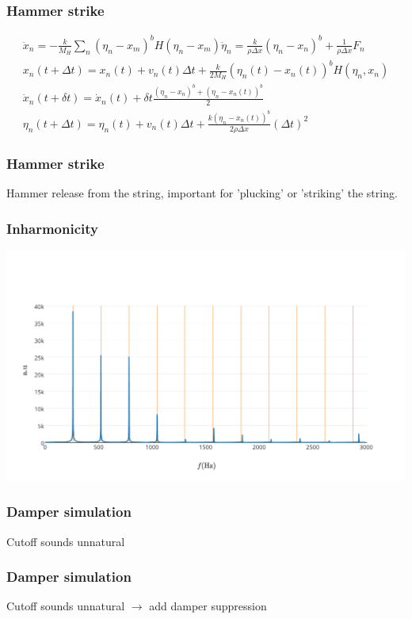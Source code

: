 \documentclass{beamer}
\begin{document}
\begin{frame}\frametitle{Hammer strike}
\begin{gather*}
\ddot{x}_n = -\frac{k}{M_H}\sum_n (\eta_n-x_m)^bH(\eta_n-x_m)\ddot{\eta}_n = \frac{k}{\rho\Delta x}\left(\eta_n-x_n\right)^b+\frac{1}{\rho\Delta x}F_n\\
x_n(t+\Delta t) = x_n(t) + v_n(t)\Delta t + \frac{k}{2M_H}\left(\eta_n(t)-x_n(t)\right)^bH(\eta_n,x_n)\\
\dot{x}_n(t+\delta t) = \dot{x}_n(t) + \delta t \frac{\left(\eta_n-x_n\right)^b+\left(\eta_n-x_n(t)\right)^b}{2}\\
\eta_n(t+\Delta t) = \eta_n(t) + v_n(t)\Delta t + \frac{k\left(\eta_n-x_n(t)\right)^b}{2\rho \Delta x}\left(\Delta t\right)^2
\end{gather*}
\end{frame}


\begin{frame}\frametitle{Hammer strike}
Hammer release from the string, important for 'plucking' or 'striking' the string.
\end{frame}


\begin{frame}\frametitle{Inharmonicity}
\begin{minipage}{1\textwidth}
		\includegraphics[width=\textwidth]{images/freq.pdf}
	\end{minipage}
\end{frame}

\begin{frame}\frametitle{Damper simulation}
Cutoff sounds unnatural
\end{frame}

\begin{frame}\frametitle{Damper simulation}
Cutoff sounds unnatural $\rightarrow$ add damper suppression
\end{frame}
\end{document}
